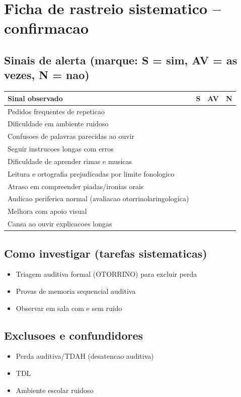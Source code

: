 \documentclass[a4paper,11pt]{book}
\begin{document}
\section*{Ficha de rastreio sistematico -- confirmacao}
\subsection*{Sinais de alerta (marque: S = sim, AV = as vezes, N = nao)}
\begin{tabular}{@{}p{11.5cm}ccc@{}}\toprule
Sinal observado & S & AV & N \\\midrule
Pedidos frequentes de repeticao & & & \\
Dificuldade em ambiente ruidoso & & & \\
Confusoes de palavras parecidas ao ouvir & & & \\
Seguir instrucoes longas com erros & & & \\
Dificuldade de aprender rimas e musicas & & & \\
Leitura e ortografia prejudicadas por limite fonologico & & & \\
Atraso em compreender piadas/ironias orais & & & \\
Audicao periferica normal (avaliacao otorrinolaringologica) & & & \\
Melhora com apoio visual & & & \\
Cansa ao ouvir explicacoes longas & & & \\
\bottomrule\end{tabular}
\subsection*{Como investigar (tarefas sistematicas)}
\begin{itemize}
\item Triagem auditiva formal (OTORRINO) para excluir perda
\item Provas de memoria sequencial auditiva
\item Observar em sala com e sem ruido
\end{itemize}
\subsection*{Exclusoes e confundidores}
\begin{itemize}
\item Perda auditiva/TDAH (desatencao auditiva)
\item TDL
\item Ambiente escolar ruidoso
\end{itemize}
\end{document}
